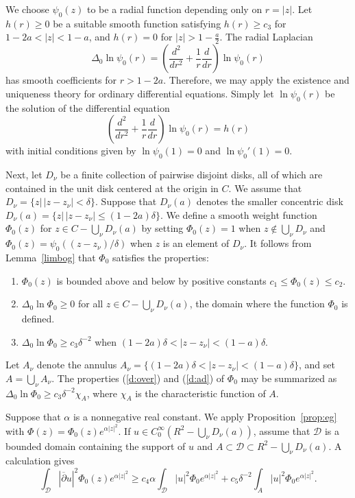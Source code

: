 \documentclass[draft]{amsart}
\theoremstyle{definition}
\theoremstyle{remark}
\newcommand{\lemref}[1]{Lemma~\ref{#1}}
\begin{document}
\begin{pf}
We choose $\psi_0(z)$ to be a radial function depending only on
$r=|z|$. Let $h(r)\geq 0$ be a suitable smooth function satisfying $h(r)\geq
c_3$ for $1-2a<|z|<1-a$, and $h(r)=0$ for $|z|>1-\tfrac a2$. The radial
Laplacian
\[\Delta_0\ln\psi_0(r)=\left(\frac {d^2}{dr^2}+\frac
1r\frac d{dr}\right)\ln\psi_0(r)\]
has smooth coefficients for $r>1-2a$. Therefore, we may
apply the existence and uniqueness theory for ordinary differential
equations. Simply let $\ln \psi_0(r)$ be the solution of the differential
equation
\[\left(\frac{d^2}{dr^2}+\frac 1r\frac d{dr}\right)\ln \psi_0(r)=h(r)\] with initial
conditions given by $\ln \psi_0(1)=0$ and $\ln\psi_0'(1)=0$.

Next, let $D_\nu$ be a finite collection of pairwise disjoint disks,
all of which are contained in the unit disk centered at the origin in
$C$. We assume that $D_\nu=\{z|\,|z-z_\nu|<\delta\}$. Suppose that
$D_\nu(a)$ denotes the smaller concentric disk $D_\nu(a)=\{z|\,
|z-z_\nu|\leq (1-2a)\delta\}$. We define a smooth weight function
$\Phi_0(z)$ for $z\in C-\bigcup_\nu D_\nu(a)$ by setting $\Phi_
0(z)=1$ when $z\notin \bigcup_\nu D_\nu$ and $\Phi_
0(z)=\psi_0((z-z_\nu)/\delta)$ when $z$ is an element of $D_\nu$. It
follows from \lemref{limbog} that $\Phi_ 0$ satisfies the properties:
\begin{enumerate}
\renewcommand{\labelenumi}{(\roman{enumi})}
\item \label{boundab}$\Phi_ 0(z)$ is bounded above and below by
positive constants $c_1\leq \Phi_ 0(z)\leq c_2$.
\item \label{d:over}$\Delta_0\ln\Phi_ 0\geq 0$ for all
$z\in C-\bigcup_\nu D_\nu(a)$,
the domain where the function $\Phi_ 0$ is defined.
\item \label{d:ad}$\Delta_0\ln\Phi_ 0\geq c_3\delta^{-2}$
when $(1-2a)\delta<|z-z_\nu|<(1-a)\delta$.
\end{enumerate}
Let $A_\nu$ denote the annulus $A_\nu=\{(1-2a)\delta<|z-z_\nu|<(1-a)
\delta \}$, and set $A=\bigcup_\nu A_\nu$. The
properties (\ref{d:over}) and (\ref{d:ad}) of $\Phi_ 0$
may be summarized as $\Delta_0\ln \Phi_ 0\geq c_3\delta^{-2}\chi_A$,
where $\chi _A$ is the characteristic function of $A$.
\end{pf}

Suppose that $\alpha$ is a nonnegative real constant. We apply
Proposition~\ref{prop:eg}
with $\Phi(z)=\Phi_ 0(z) e^{\alpha|z|^2}$. If $u\in C^\infty_0(R^2-\bigcup_\nu
D_\nu(a))$, assume that $\mathcal{D}$ is a bounded domain containing the  support of
$u$ and $A\subset \mathcal{D}\subset R^2-\bigcup_\nu D_\nu(a)$. A calculation gives
\[\int_{\mathcal{D}}|\overline\partial u|^2\Phi_ 0(z) e^{\alpha|z|^2}\geq c_4\alpha
\int_{\mathcal{D}}|u|^2\Phi_ 0e^{\alpha|z|^2}+c_5\delta^{-2}\int_ A|u|^2\Phi_ 0e^{
\alpha|z|^2}.\]
\end{document}

